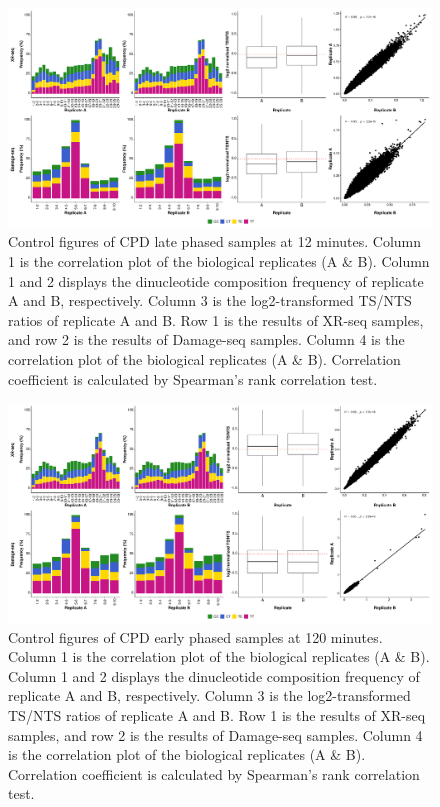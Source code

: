 \begin{figure}[H]
    \begin{center}
    \includegraphics[width=\textwidth]{Chapters/7_appendix/figures/supfig7}
    \caption[Control figures of CPD late phased samples at 12 minutes.]{Control figures of CPD late phased samples at 12 minutes. Column 1 is the correlation plot of the biological replicates (A \& B). Column 1 and 2 displays the dinucleotide composition frequency of replicate A and B, respectively. Column 3 is the log2-transformed TS/NTS ratios of replicate A and B. Row 1 is the results of XR-seq samples, and row 2 is the results of Damage-seq samples. Column 4 is the correlation plot of the biological replicates (A \& B). Correlation coefficient is calculated by Spearman’s rank correlation test.}
    \label{supfig:control6}
    \end{center}
    \end{figure}

\begin{figure}[H]
    \begin{center}
    \includegraphics[width=\textwidth]{Chapters/7_appendix/figures/supfig8}
    \caption[Control figures of CPD early phased samples at 120 minutes.]{Control figures of CPD early phased samples at 120 minutes. Column 1 is the correlation plot of the biological replicates (A \& B). Column 1 and 2 displays the dinucleotide composition frequency of replicate A and B, respectively. Column 3 is the log2-transformed TS/NTS ratios of replicate A and B. Row 1 is the results of XR-seq samples, and row 2 is the results of Damage-seq samples. Column 4 is the correlation plot of the biological replicates (A \& B). Correlation coefficient is calculated by Spearman’s rank correlation test.}
    \label{supfig:control7}
    \end{center}
    \end{figure}

